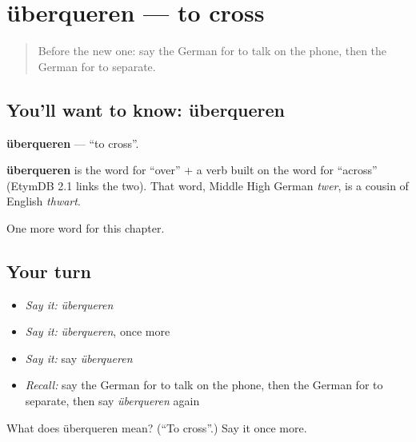 \section[überqueren]{überqueren — to cross}

\label{lesson:GE-C188-ueberqueren}



\begin{quote}
Before the new one: say the German for to talk on the phone, then the German for to separate.
\end{quote}

\subsection*{You'll want to know: überqueren}
\textbf{überqueren} — \textquotedblleft{}to cross\textquotedblright{}.

\begin{cousinweb}
\textbf{überqueren} is the word for \textquotedblleft{}over\textquotedblright{} + a verb built on the word for \textquotedblleft{}across\textquotedblright{} (EtymDB 2.1 links the two). That word, Middle High German \emph{twer}, is a cousin of English \emph{thwart}.
\end{cousinweb}

\begin{grammarlens}[title={What you've built}]
One more word for this chapter.
\end{grammarlens}

\subsection*{Your turn}
\begin{itemize}
\raggedright
  \item \emph{Say it:} \emph{überqueren}
  \item \emph{Say it:} \emph{überqueren}, once more
  \item \emph{Say it:} say \emph{überqueren}
  \item \emph{Recall:} say the German for to talk on the phone, then the German for to separate, then say \emph{überqueren} again
\end{itemize}

\begin{tcolorbox}[breakable,colback=teal!4,colframe=teal!35!black,title={Before you move on}]
What does überqueren mean? (\textquotedblleft{}To cross\textquotedblright{}.) Say it once more.
\end{tcolorbox}
